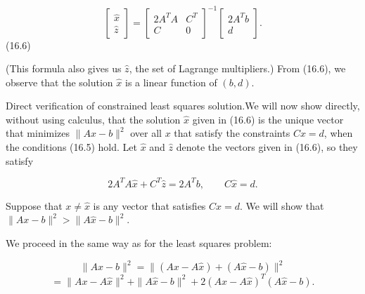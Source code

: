 \[\left[\begin{array}{c}\hat{x}\\ \hat{z}\end{array}\right]=\left[\begin{array}{cc}2A^{T}A&C^{T}\\ C&0\end{array}\right]^{-1}\left[\begin{array}{c}2A^{T}b\\ d\end{array}\right].\] (16.6)

(This formula also gives us \(\hat{z}\), the set of Lagrange multipliers.) From (16.6), we observe that the solution \(\hat{x}\) is a linear function of \((b,d)\).

Direct verification of constrained least squares solution.We will now show directly, without using calculus, that the solution \(\hat{x}\) given in (16.6) is the unique vector that minimizes \(\|Ax-b\|^{2}\) over all \(x\) that satisfy the constraints \(Cx=d\), when the conditions (16.5) hold. Let \(\hat{x}\) and \(\hat{z}\) denote the vectors given in (16.6), so they satisfy

\[2A^{T}A\hat{x}+C^{T}\hat{z}=2A^{T}b,\qquad C\hat{x}=d.\]

Suppose that \(x\neq\hat{x}\) is any vector that satisfies \(Cx=d\). We will show that \(\|Ax-b\|^{2}>\|A\hat{x}-b\|^{2}\).

We proceed in the same way as for the least squares problem:

\[\|Ax-b\|^{2} = \|(Ax-A\hat{x})+(A\hat{x}-b)\|^{2}\] \[= \|Ax-A\hat{x}\|^{2}+\|A\hat{x}-b\|^{2}+2(Ax-A\hat{x})^{T}(A\hat{x }-b).\] 